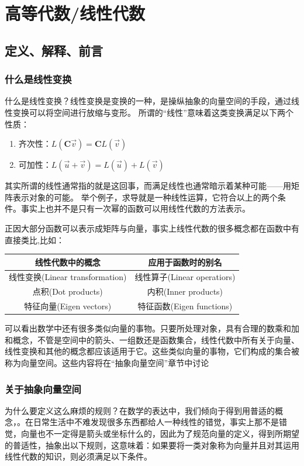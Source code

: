 \documentclass[UTF8]{ctexbook}
\begin{document}
{{{{}%

}%

}%

\section{高等代数/线性代数}{
\subsection{定义、解释、前言}{
\subsubsection{什么是线性变换}{
  什么是线性变换？线性变换是变换的一种，是操纵抽象的向量空间的手段，通过线性变换可以将空间进行放缩与变形。
  所谓的“线性”意味着这类变换满足以下两个性质：

  \begin{enumerate}
    \item 齐次性：$L(\mathbf{C}\vec{v}) = \mathbf{C}L(\vec{v})$
    \item 可加性：$L(\vec{u}+\vec{v}) = L(\vec{u})+L(\vec{v})$
  \end{enumerate}

  其实所谓的线性通常指的就是这回事，而满足线性也通常暗示着某种可能——用矩阵表示对象的可能。
  举个例子，求导就是一种线性运算，它符合以上的两个条件。事实上也并不是只有一次幂的函数可以用线性代数的方法表示。

  正因大部分函数可以表示成矩阵与向量，事实上线性代数的很多概念都在函数中有直接类比,比如：

  \begin{tabular}{c|c}
    \hline
    线性代数中的概念                & 应用于函数时的别名          \\
    \hline
    线性变换(Linear transformation) & 线性算子(Linear operatiors) \\
    点积(Dot products)              & 内积(Inner products)        \\
    特征向量(Eigen vectors)         & 特征函数(Eigen functions)
  \end{tabular}

  可以看出数学中还有很多类似向量的事物。只要所处理对象，具有合理的数乘和加和概念，不管是空间中的箭头、一组数还是函数集合，线性代数中所有关于向量、线性变换和其他的概念都应该适用于它。这些类似向量的事物，它们构成的集合被称为向量空间。这些内容将在“抽象向量空间”章节中讨论
}%

\subsubsection{关于抽象向量空间}{
为什么要定义这么麻烦的规则？在数学的表达中，我们倾向于得到用普适的概念，{}。在日常生活中不难发现很多东西都给人一种线性的错觉，事实上那不是错觉，向量也不一定得是箭头或坐标什么的，因此为了规范向量的定义，得到所期望的普适性，抽象出以下规则，这意味着：如果要将一类对象称为向量并且对其运用线性代数的知识，则必须满足以下条件。

}}}}
\end{document}
